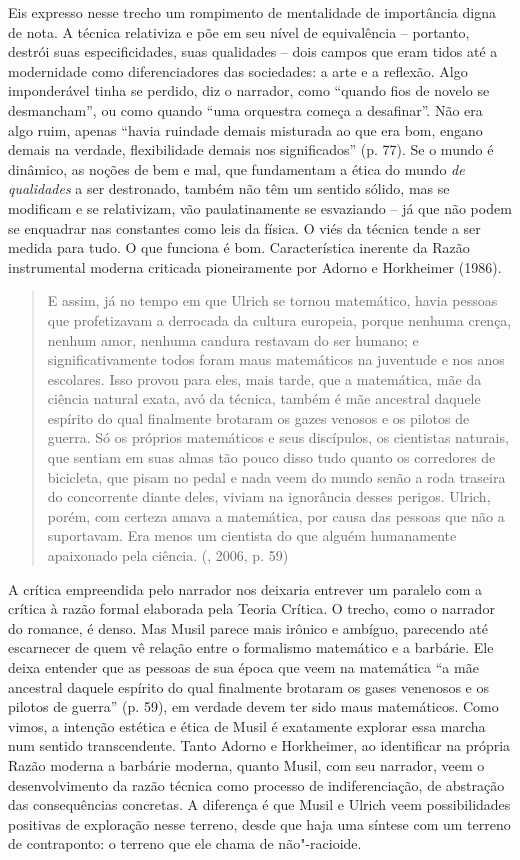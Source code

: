 Eis expresso nesse trecho um rompimento de mentalidade de importância
digna de nota. A técnica relativiza e põe em seu nível de equivalência
-- portanto, destrói suas especificidades, suas qualidades -- dois
campos que eram tidos até a modernidade como diferenciadores das
sociedades: a arte e a reflexão. Algo imponderável tinha se perdido, diz
o narrador, como ``quando fios de novelo se desmancham'', ou como quando
``uma orquestra começa a desafinar''. Não era algo ruim, apenas ``havia
ruindade demais misturada ao que era bom, engano demais na verdade,
flexibilidade demais nos significados'' (p. 77). Se o mundo é dinâmico,
as noções de bem e mal, que fundamentam a ética do mundo \emph{de
qualidades} a ser destronado, também não têm um sentido sólido, mas se
modificam e se relativizam, vão paulatinamente se esvaziando -- já que
não podem se enquadrar nas constantes como leis da física. O viés da
técnica tende a ser medida para tudo. O que funciona é bom.
Característica inerente da Razão instrumental moderna criticada
pioneiramente por Adorno e Horkheimer (1986).

\begin{quote}
E assim, já no tempo em que Ulrich se tornou matemático, havia pessoas
que profetizavam a derrocada da cultura europeia, porque nenhuma crença,
nenhum amor, nenhuma candura restavam do ser humano; e
significativamente todos foram maus matemáticos na juventude e nos anos
escolares. Isso provou para eles, mais tarde, que a matemática, mãe da
ciência natural exata, avó da técnica, também é mãe ancestral daquele
espírito do qual finalmente brotaram os gazes venosos e os pilotos de
guerra. Só os próprios matemáticos e seus discípulos, os cientistas
naturais, que sentiam em suas almas tão pouco disso tudo quanto os
corredores de bicicleta, que pisam no pedal e nada veem do mundo senão a
roda traseira do concorrente diante deles, viviam na ignorância desses
perigos. Ulrich, porém, com certeza amava a matemática, por causa das
pessoas que não a suportavam. Era menos um cientista do que alguém
humanamente apaixonado pela ciência. (, 2006, p. 59)
\end{quote}

A crítica empreendida pelo narrador nos deixaria entrever um paralelo
com a crítica à razão formal elaborada pela Teoria Crítica. O trecho,
como o narrador do romance, é denso. Mas Musil parece mais irônico e
ambíguo, parecendo até escarnecer de quem vê relação entre o formalismo
matemático e a barbárie. Ele deixa entender que as pessoas de sua época
que veem na matemática ``a mãe ancestral daquele espírito do qual
finalmente brotaram os gases venenosos e os pilotos de guerra'' (p. 59),
em verdade devem ter sido maus matemáticos. Como vimos, a intenção
estética e ética de Musil é exatamente explorar essa marcha num sentido
transcendente. Tanto Adorno e Horkheimer, ao identificar na própria
Razão moderna a barbárie moderna, quanto Musil, com seu narrador, veem o
desenvolvimento da razão técnica como processo de indiferenciação, de
abstração das consequências concretas. A diferença é que Musil e Ulrich
veem possibilidades positivas de exploração nesse terreno, desde que
haja uma síntese com um terreno de contraponto: o terreno que ele chama
de não"-racioide.

